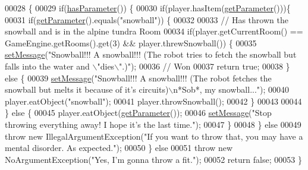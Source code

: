 \begin{DoxyCode}
00028                                                                                               \{
00029         \textcolor{keywordflow}{if}(\hyperlink{classpkg__commands_1_1Command_a02af95ab3f1898a66259ab7c177b6998}{hasParameter}()) \{
00030             \textcolor{keywordflow}{if}(player.hasItem(\hyperlink{classpkg__commands_1_1Command_a41c92d445be73ea9d62320c65efb8434}{getParameter}()))\{
00031                 \textcolor{keywordflow}{if}(\hyperlink{classpkg__commands_1_1Command_a41c92d445be73ea9d62320c65efb8434}{getParameter}().equals(\textcolor{stringliteral}{"snowball"})) \{
00032 
00033                     \textcolor{comment}{// Has thrown the snowball and is in the alpine tundra Room}
00034                     \textcolor{keywordflow}{if}(player.getCurrentRoom() == GameEngine.getRooms().\textcolor{keyword}{get}(3) && player.threwSnowball()) \{
00035                         \hyperlink{classpkg__commands_1_1Command_ae210ff216fe908b111ba1c988a963d13}{setMessage}(\textcolor{stringliteral}{"Snowball!!! A snowball!!! (The robot tries to fetch the
       snowball but falls into the water and \(\backslash\)"dies\(\backslash\)".)"});
00036                         \textcolor{comment}{// Won}
00037                         \textcolor{keywordflow}{return} \textcolor{keyword}{true};
00038                     \} \textcolor{keywordflow}{else} \{
00039                         \hyperlink{classpkg__commands_1_1Command_ae210ff216fe908b111ba1c988a963d13}{setMessage}(\textcolor{stringliteral}{"Snowball!!! A snowball!!! (The robot fetches the snowball but
       melts it because of it's circuits)\(\backslash\)n*Sob*, my snowball..."});
00040                         player.eatObject(\textcolor{stringliteral}{"snowball"});
00041                         player.throwSnowball();
00042                     \}
00043 
00044                 \} \textcolor{keywordflow}{else} \{
00045                     player.eatObject(\hyperlink{classpkg__commands_1_1Command_a41c92d445be73ea9d62320c65efb8434}{getParameter}());
00046                     \hyperlink{classpkg__commands_1_1Command_ae210ff216fe908b111ba1c988a963d13}{setMessage}(\textcolor{stringliteral}{"Stop throwing everything away! I hope it's the last time."});
00047                 \}
00048             \} \textcolor{keywordflow}{else}
00049                 \textcolor{keywordflow}{throw} \textcolor{keyword}{new} IllegalArgumentException(\textcolor{stringliteral}{"If you want to throw that, you may have a mental
       disorder. As expected."});
00050         \} \textcolor{keywordflow}{else}
00051             \textcolor{keywordflow}{throw} \textcolor{keyword}{new} NoArgumentException(\textcolor{stringliteral}{"Yes, I'm gonna throw a fit."});
00052         \textcolor{keywordflow}{return} \textcolor{keyword}{false};
00053     \}
\end{DoxyCode}


